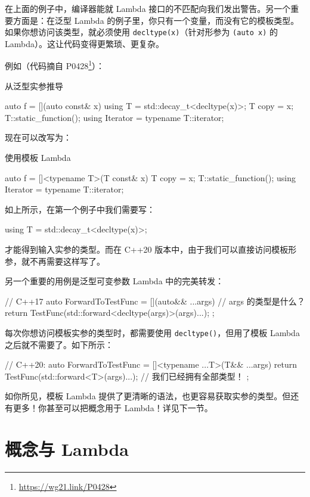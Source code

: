 在上面的例子中，编译器能就 Lambda 接口的不匹配向我们发出警告。另一个重要方面是：在泛型 Lambda 的例子里，你只有一个变量，而没有它的模板类型。如果你想访问该类型，就必须使用 \texttt{decltype(x)}（针对形参为 \texttt{(auto x)} 的 Lambda）。这让代码变得更繁琐、更复杂。

例如（代码摘自 P0428\footnote{\url{https://wg21.link/P0428}}）：

从泛型实参推导

\begin{codebox}
auto f = [](auto const& x) {
using T = std::decay_t<decltype(x)>;
T copy = x;
T::static_function();
using Iterator = typename T::iterator;
}
\end{codebox}

现在可以改写为：

使用模板 Lambda

\begin{codebox}
auto f = []<typename T>(T const& x) {
T copy = x;
T::static_function();
using Iterator = typename T::iterator;
}
\end{codebox}

如上所示，在第一个例子中我们需要写：

\begin{codebox}
using T = std::decay_t<decltype(x)>;
\end{codebox}

才能得到输入实参的类型。而在 C++20 版本中，由于我们可以直接访问模板形参，就不再需要这样写了。

另一个重要的用例是泛型可变参数 Lambda 中的完美转发：

\begin{codebox}
// C++17
auto ForwardToTestFunc = [](auto&& ...args) {
// args 的类型是什么？
return TestFunc(std::forward<decltype(args)>(args)...);
};
\end{codebox}

每次你想访问模板实参的类型时，都需要使用 \texttt{decltype()}，但用了模板 Lambda 之后就不需要了。如下所示：

\begin{codebox}
// C++20:
auto ForwardToTestFunc = []<typename ...T>(T&& ...args) {
return TestFunc(std::forward<T>(args)...); // 我们已经拥有全部类型！
};
\end{codebox}

如你所见，模板 Lambda 提供了更清晰的语法，也更容易获取实参的类型。但还有更多！你甚至可以把概念用于 Lambda！详见下一节。

\section{概念与 Lambda}

